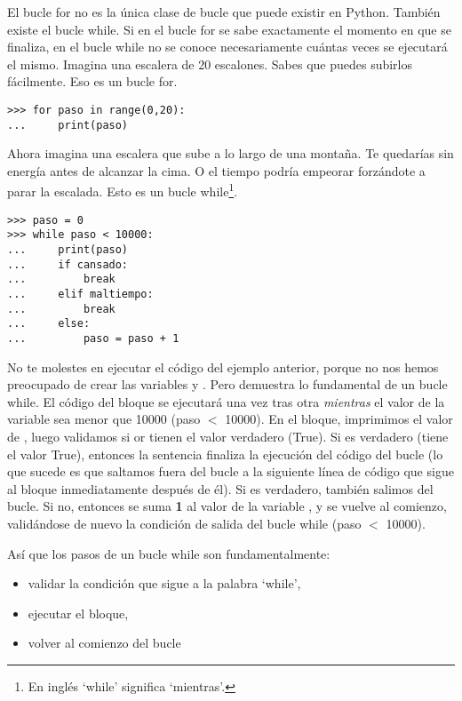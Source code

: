El bucle for no es la única clase de bucle que puede existir en Python. También existe el bucle while. Si en el bucle for se sabe exactamente el momento en que se finaliza, en el bucle while no se conoce necesariamente cuántas veces se ejecutará el mismo. Imagina una escalera de 20 escalones.  Sabes que puedes subirlos fácilmente.  Eso es un bucle for.

\begin{listing}
\begin{verbatim}
>>> for paso in range(0,20):
...     print(paso)
\end{verbatim}
\end{listing}

Ahora imagina una escalera que sube a lo largo de una montaña.  Te quedarías sin energía antes de alcanzar la cima.  O el tiempo podría empeorar forzándote a parar la escalada.  Esto es un bucle while\footnote{En inglés `while' significa `mientras'.}.

\begin{listingignore}
\begin{verbatim}
>>> paso = 0
>>> while paso < 10000:
...     print(paso)
...     if cansado:
...         break
...     elif maltiempo:
...         break
...     else:
...         paso = paso + 1
\end{verbatim}
\end{listingignore}

No te molestes en ejecutar el código del ejemplo anterior, porque no nos hemos preocupado de crear las variables  y .  Pero demuestra lo fundamental de un bucle while.  El código del bloque se ejecutará una vez tras otra \emph{mientras} el valor de la variable  sea menor que 10000 (paso $<$ 10000).  En el bloque, imprimimos el valor de , luego validamos si  or  tienen el valor verdadero (True). Si  es verdadero (tiene el valor True), entonces la sentencia  finaliza la ejecución del código del bucle (lo que sucede es que saltamos fuera del bucle a la siguiente línea de código que sigue al bloque inmediatamente después de él).  Si  es verdadero, también salimos del bucle.  Si no, entonces se suma \textbf{1} al valor de la variable , y se vuelve al comienzo, validándose de nuevo la condición de salida del bucle while (paso $<$ 10000).
\par
\noindent
Así que los pasos de un bucle while son fundamentalmente:

{\renewcommand{\labelitemi}{$\triangleright$}
\begin{itemize}
\item validar la condición que sigue a la palabra `while',
\item ejecutar el bloque,
\item volver al comienzo del bucle
\end{itemize}}

